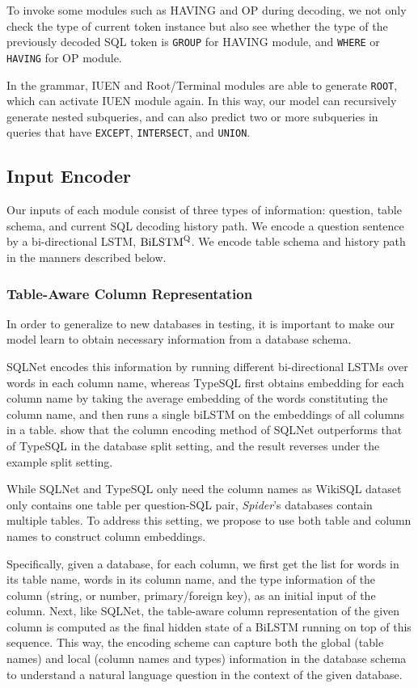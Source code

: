 \documentclass[11pt,a4paper]{article}
\begin{document}
To invoke some modules such as HAVING and OP during decoding, we not only check the type of current token instance but also see whether the type of the previously decoded SQL token is \texttt{GROUP} for HAVING module, and \texttt{WHERE} or \texttt{HAVING} for OP module.

In the grammar, IUEN and Root/Terminal modules are able to generate \texttt{ROOT}, which can activate IUEN module again.
In this way, our model can recursively generate nested subqueries, and can also predict two or more subqueries in queries that have \texttt{EXCEPT}, \texttt{INTERSECT}, and \texttt{UNION}.


\subsection{Input Encoder}

Our inputs of each module consist of three types of information: question, table schema, and current SQL decoding history path.
We encode a question sentence by a bi-directional LSTM, $\rm{BiLSTM}^{\rm{Q}}$.
We encode table schema and history path in the manners described below. 

\subsubsection{Table-Aware Column Representation}
\label{sec:col_emb}
In order to generalize to new databases in testing, it is important to make our model learn to obtain necessary information from a database schema.

SQLNet \cite{Xu2017} encodes this information by running different bi-directional LSTMs over words in each column name, whereas TypeSQL \cite{Yu18} first obtains embedding for each column name by taking the average embedding of the words constituting the column name, and then runs a single biLSTM on the embeddings of all columns in a table. \citet{Yu&al.18.emnlp.corpus} show that the column encoding method of SQLNet outperforms that of TypeSQL in the database split setting, and the result reverses under the example split setting.

While SQLNet and TypeSQL only need the column names as WikiSQL dataset only contains one table per question-SQL pair, \textit{Spider}'s databases contain multiple tables.
To address this setting, we propose to use both table and column names to construct column embeddings. 

Specifically, given a database, for each column, we first get the list for words in its table name, words in its column name, and the type information of the column (string, or number, primary/foreign key), as an initial input of the column. 
Next, like SQLNet, the table-aware column representation of the given column is computed as the final hidden state of a BiLSTM running on top of this sequence. 
This way, the encoding scheme can capture both the global (table names) and local (column names and types) information in the database schema to understand a natural language question in the context of the given database.
\end{document}

